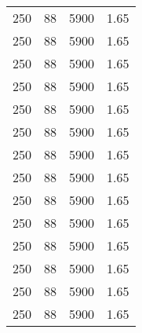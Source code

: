 \begin{ThreePartTable}
\begin{longtable}[c]{*{4}{c}}
    250	& 88 & 5900	& 1.65 \\
    250	& 88 & 5900	& 1.65 \\
    250	& 88 & 5900	& 1.65 \\
    250	& 88 & 5900	& 1.65 \\
    250	& 88 & 5900	& 1.65 \\
    250	& 88 & 5900	& 1.65 \\
    250	& 88 & 5900	& 1.65 \\
    250	& 88 & 5900	& 1.65 \\
    250	& 88 & 5900	& 1.65 \\
    250	& 88 & 5900	& 1.65 \\
    250	& 88 & 5900	& 1.65 \\
    250	& 88 & 5900	& 1.65 \\
    250	& 88 & 5900	& 1.65 \\
    250	& 88 & 5900	& 1.65 \\
    \bottomrule
  \end{longtable}
\end{ThreePartTable}
